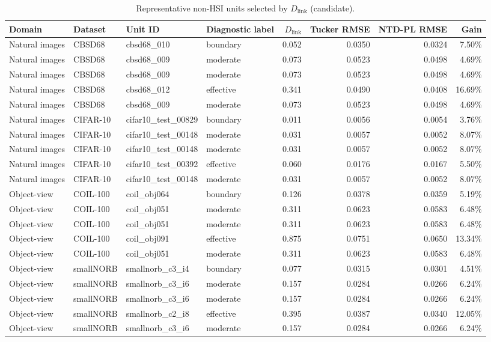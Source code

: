 \begin{table}[t]
\centering
\caption{Representative non-HSI units selected by $D_{\mathrm{link}}$ (candidate).}
\begin{tabular}{@{}l l l l r r r r@{}}
\toprule
Domain & Dataset & Unit ID & Diagnostic label & $D_{\mathrm{link}}$ & Tucker RMSE & NTD-PL RMSE & Gain \\
\midrule
Natural images & CBSD68 & cbsd68_010 & boundary & 0.052 & 0.0350 & 0.0324 & 7.50\% \\
Natural images & CBSD68 & cbsd68_009 & moderate & 0.073 & 0.0523 & 0.0498 & 4.69\% \\
Natural images & CBSD68 & cbsd68_009 & moderate & 0.073 & 0.0523 & 0.0498 & 4.69\% \\
Natural images & CBSD68 & cbsd68_012 & effective & 0.341 & 0.0490 & 0.0408 & 16.69\% \\
Natural images & CBSD68 & cbsd68_009 & moderate & 0.073 & 0.0523 & 0.0498 & 4.69\% \\
Natural images & CIFAR-10 & cifar10_test_00829 & boundary & 0.011 & 0.0056 & 0.0054 & 3.76\% \\
Natural images & CIFAR-10 & cifar10_test_00148 & moderate & 0.031 & 0.0057 & 0.0052 & 8.07\% \\
Natural images & CIFAR-10 & cifar10_test_00148 & moderate & 0.031 & 0.0057 & 0.0052 & 8.07\% \\
Natural images & CIFAR-10 & cifar10_test_00392 & effective & 0.060 & 0.0176 & 0.0167 & 5.50\% \\
Natural images & CIFAR-10 & cifar10_test_00148 & moderate & 0.031 & 0.0057 & 0.0052 & 8.07\% \\
Object-view & COIL-100 & coil_obj064 & boundary & 0.126 & 0.0378 & 0.0359 & 5.19\% \\
Object-view & COIL-100 & coil_obj051 & moderate & 0.311 & 0.0623 & 0.0583 & 6.48\% \\
Object-view & COIL-100 & coil_obj051 & moderate & 0.311 & 0.0623 & 0.0583 & 6.48\% \\
Object-view & COIL-100 & coil_obj091 & effective & 0.875 & 0.0751 & 0.0650 & 13.34\% \\
Object-view & COIL-100 & coil_obj051 & moderate & 0.311 & 0.0623 & 0.0583 & 6.48\% \\
Object-view & smallNORB & smallnorb_c3_i4 & boundary & 0.077 & 0.0315 & 0.0301 & 4.51\% \\
Object-view & smallNORB & smallnorb_c3_i6 & moderate & 0.157 & 0.0284 & 0.0266 & 6.24\% \\
Object-view & smallNORB & smallnorb_c3_i6 & moderate & 0.157 & 0.0284 & 0.0266 & 6.24\% \\
Object-view & smallNORB & smallnorb_c2_i8 & effective & 0.395 & 0.0387 & 0.0340 & 12.05\% \\
Object-view & smallNORB & smallnorb_c3_i6 & moderate & 0.157 & 0.0284 & 0.0266 & 6.24\% \\
\bottomrule
\end{tabular}
\end{table}
